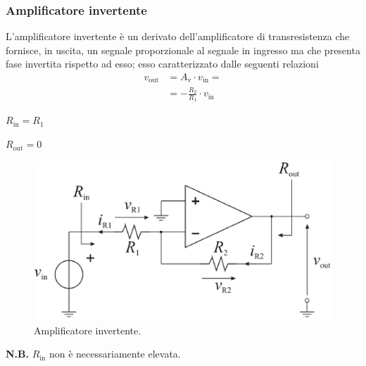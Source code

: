 \documentclass[a4paper]{article}
\begin{document}
			\subsubsection{Amplificatore invertente}
				L'amplificatore invertente è un derivato dell'amplificatore di transresistenza che fornisce, in uscita, un segnale proporzionale al segnale in ingresso ma che presenta fase invertita rispetto ad esso; esso caratterizzato dalle seguenti relazioni
				\begin{equation*}
				\begin{split}
					v_{\mathrm{out}} &= A_{\mathrm{v}} \cdot v_{\mathrm{in}} = \\
									 &= -\frac{R_{2}}{R_{1}} \cdot v_{\mathrm{in}}
				\end{split}
				\end{equation*}
				\begin{center}
					$ R_{\mathrm{in}} = R_{1} $
				\end{center}
				\newline
				\begin{center}
					$ R_{\mathrm{out}} = 0 $
				\end{center}
				\newline
				\begin{figure}[h!]
					\centering
					\includegraphics[scale=0.7]{amplificatoreInvertente}
					\caption{Amplificatore invertente.}
					\label{fig:amplificatoreInvertente}
				\end{figure}
				\newline
				\begin{scriptsize}
					\textbf{N.B.} $ R_{\mathrm{in}} $ non è necessariamente elevata. 
				\end{scriptsize}
\end{document}
